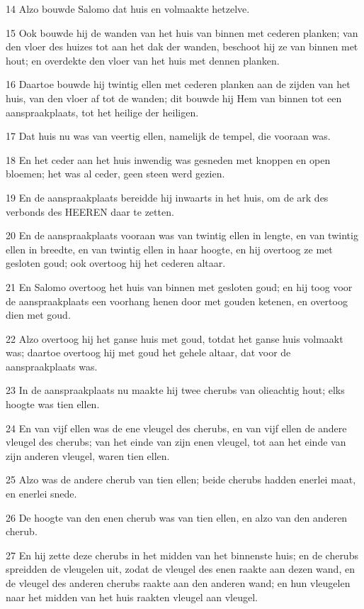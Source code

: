 \par 14 Alzo bouwde Salomo dat huis en volmaakte hetzelve.
\par 15 Ook bouwde hij de wanden van het huis van binnen met cederen planken; van den vloer des huizes tot aan het dak der wanden, beschoot hij ze van binnen met hout; en overdekte den vloer van het huis met dennen planken.
\par 16 Daartoe bouwde hij twintig ellen met cederen planken aan de zijden van het huis, van den vloer af tot de wanden; dit bouwde hij Hem van binnen tot een aanspraakplaats, tot het heilige der heiligen.
\par 17 Dat huis nu was van veertig ellen, namelijk de tempel, die vooraan was.
\par 18 En het ceder aan het huis inwendig was gesneden met knoppen en open bloemen; het was al ceder, geen steen werd gezien.
\par 19 En de aanspraakplaats bereidde hij inwaarts in het huis, om de ark des verbonds des HEEREN daar te zetten.
\par 20 En de aanspraakplaats vooraan was van twintig ellen in lengte, en van twintig ellen in breedte, en van twintig ellen in haar hoogte, en hij overtoog ze met gesloten goud; ook overtoog hij het cederen altaar.
\par 21 En Salomo overtoog het huis van binnen met gesloten goud; en hij toog voor de aanspraakplaats een voorhang henen door met gouden ketenen, en overtoog dien met goud.
\par 22 Alzo overtoog hij het ganse huis met goud, totdat het ganse huis volmaakt was; daartoe overtoog hij met goud het gehele altaar, dat voor de aanspraakplaats was.
\par 23 In de aanspraakplaats nu maakte hij twee cherubs van olieachtig hout; elks hoogte was tien ellen.
\par 24 En van vijf ellen was de ene vleugel des cherubs, en van vijf ellen de andere vleugel des cherubs; van het einde van zijn enen vleugel, tot aan het einde van zijn anderen vleugel, waren tien ellen.
\par 25 Alzo was de andere cherub van tien ellen; beide cherubs hadden enerlei maat, en enerlei snede.
\par 26 De hoogte van den enen cherub was van tien ellen, en alzo van den anderen cherub.
\par 27 En hij zette deze cherubs in het midden van het binnenste huis; en de cherubs spreidden de vleugelen uit, zodat de vleugel des enen raakte aan dezen wand, en de vleugel des anderen cherubs raakte aan den anderen wand; en hun vleugelen naar het midden van het huis raakten vleugel aan vleugel.
